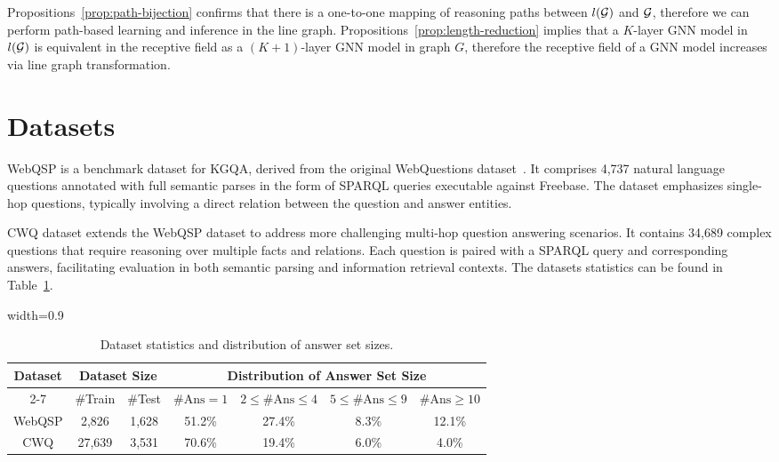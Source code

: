 \noindent
Propositions~\ref{prop:path-bijection} confirms that there is a one-to-one mapping of reasoning paths between $l(\mathcal{G})$ and $\mathcal{G}$, therefore we can perform path-based learning and inference in the line graph. Propositions~\ref{prop:length-reduction} implies that a $K$-layer GNN model in $l(\mathcal{G})$ is equivalent in the receptive field as a $(K+1)$-layer GNN model in graph $G$, therefore the receptive field of a GNN model increases via line graph transformation.

\section{Datasets}
\label{dataset}
WebQSP is a benchmark dataset for KGQA, derived from the original WebQuestions dataset~\cite{berant2013semantic}. It comprises 4,737 natural language questions annotated with full semantic parses in the form of SPARQL queries executable against Freebase. The dataset emphasizes single-hop questions, typically involving a direct relation between the question and answer entities.

CWQ dataset extends the WebQSP dataset to address more challenging multi-hop question answering scenarios. It contains 34,689 complex questions that require reasoning over multiple facts and relations. Each question is paired with a SPARQL query and corresponding answers, facilitating evaluation in both semantic parsing and information retrieval contexts. The datasets statistics can be found in Table~\ref{tab:dataset_stats}. 

\begin{table}[!t]
\centering
\caption{Dataset statistics and distribution of answer set sizes.}
\label{tab:dataset_stats}
\begin{adjustbox}{width=0.9\textwidth}
\begin{tabular}{c|cc|cccc}
\toprule
\multirow{2}{*}{Dataset} & \multicolumn{2}{c|}{Dataset Size} & \multicolumn{4}{c}{Distribution of Answer Set Size} \\
\cmidrule{2-7}
 & \#Train & \#Test & $\#\text{Ans}=1$ & $2 \leq \#\text{Ans} \leq 4$ & $5 \leq \#\text{Ans} \leq 9$ & $\#\text{Ans} \geq 10$ \\
\midrule
WebQSP & 2,826 & 1,628 & 51.2\% & 27.4\% & 8.3\% & 12.1\% \\
CWQ    & 27,639 & 3,531 & 70.6\% & 19.4\% & 6.0\% & 4.0\% \\
\bottomrule
\end{tabular}
\end{adjustbox}
\end{table}


